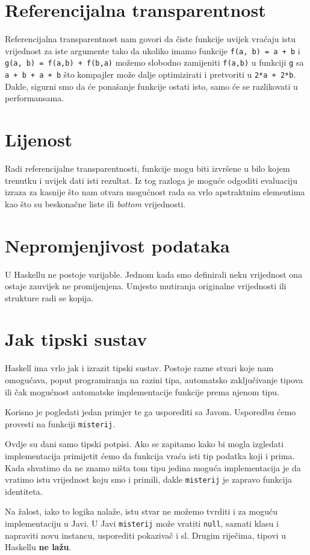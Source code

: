 \section{Referencijalna transparentnost}

Referencijalna transparentnost nam govori da čiste funkcije uvijek vraćaju istu vrijednost za iste argumente tako da ukoliko imamo funkcije \texttt{f(a, b) = a + b} i \texttt{g(a, b) = f(a,b) + f(b,a)} možemo slobodno zamijeniti \texttt{f(a,b)} u funkciji \texttt{g} sa \texttt{a + b + a + b} što kompajler može dalje optimizirati i pretvoriti u \texttt{2*a + 2*b}. Dakle, sigurni smo da će ponašanje funkcije ostati isto, samo će se razlikovati u performansama.

\section{Lijenost}

Radi referencijalne transparentnosti, funkcije mogu biti izvršene u bilo kojem trenutku i uvijek dati isti rezultat. Iz tog razloga je moguće odgoditi evaluaciju izraza za kasnije što nam otvara mogućnost rada sa vrlo apstraktnim elementima kao što su beskonačne liste ili \textit{bottom} vrijednosti.

\section{Nepromjenjivost podataka}

U Haskellu ne postoje varijable. Jednom kada smo definirali neku vrijednost ona ostaje zauvijek ne promijenjena. Umjesto mutiranja originalne vrijednosti ili strukture radi se kopija.

\section{Jak tipski sustav}

Haskell ima vrlo jak i izrazit tipski sustav. Postoje razne stvari koje nam omogućava, poput programiranja na razini tipa, automatsko zaključivanje tipova ili čak mogućnost automatske implementacije funkcije prema njenom tipu.

Korisno je pogledati jedan primjer te ga usporediti sa Javom. Usporedbu ćemo provesti na funkciji \texttt{misterij}.



Ovdje su dani samo tipski potpisi. Ako se zapitamo kako bi mogla izgledati implementacija primijetit ćemo da funkcija vraća isti tip podatka koji i prima. Kada shvatimo da ne znamo ništa tom tipu jedina moguća implementacija je da vratimo istu vrijednost koju smo i primili, dakle \texttt{misterij} je zapravo funkcija identiteta.

Na žalost, iako to logika nalaže, istu stvar ne možemo tvrditi i za moguću implementaciju u Javi. U Javi \texttt{misterij} može vratiti \texttt{null}, saznati klasu i napraviti novu instancu, usporediti pokazivač i sl. Drugim riječima, tipovi u Haskellu \textbf{ne lažu}.